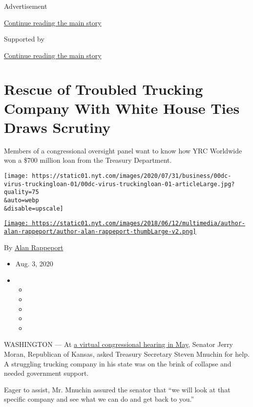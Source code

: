Advertisement

\protect\hyperlink{after-top}{Continue reading the main story}

Supported by

\protect\hyperlink{after-sponsor}{Continue reading the main story}

\hypertarget{rescue-of-troubled-trucking-company-with-white-house-ties-draws-scrutiny}{%
\section{Rescue of Troubled Trucking Company With White House Ties Draws
Scrutiny}\label{rescue-of-troubled-trucking-company-with-white-house-ties-draws-scrutiny}}

Members of a congressional oversight panel want to know how YRC
Worldwide won a \$700 million loan from the Treasury Department.

\texttt{[image: https://static01.nyt.com/images/2020/07/31/business/00dc-virus-truckingloan-01/00dc-virus-truckingloan-01-articleLarge.jpg?quality=75\\\&auto=webp\\\&disable=upscale]}

\href{https://www.nytimes.com/by/alan-rappeport}{\texttt{[image: https://static01.nyt.com/images/2018/06/12/multimedia/author-alan-rappeport/author-alan-rappeport-thumbLarge-v2.png]}}

By \href{https://www.nytimes.com/by/alan-rappeport}{Alan Rappeport}

\begin{itemize}
\item
  Aug. 3, 2020
\item
  \begin{itemize}
  \item
  \item
  \item
  \item
  \item
  \end{itemize}
\end{itemize}

WASHINGTON --- At
\href{https://www.c-span.org/video/?472163-1/fed-reserve-chair-treasury-secretary-testimony-coronavirus-relief-bill}{a
virtual congressional hearing in May}, Senator Jerry Moran, Republican
of Kansas, asked Treasury Secretary Steven Mnuchin for help. A
struggling trucking company in his state was on the brink of collapse
and needed government support.

Eager to assist, Mr. Mnuchin assured the senator that ``we will look at
that specific company and see what we can do and get back to you.''

